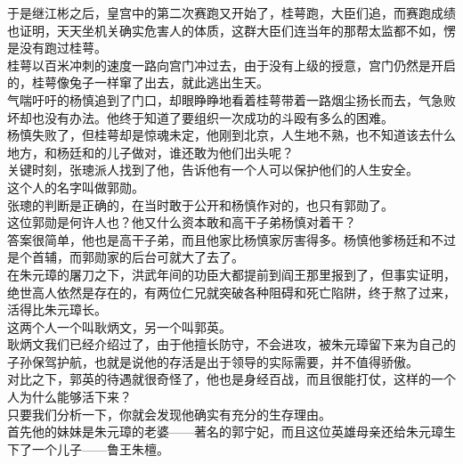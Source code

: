 \begin{multicols}{\theparacolNo}
于是继江彬之后，皇宫中的第二次赛跑又开始了，桂萼跑，大臣们追，而赛跑成绩也证明，天天坐机关确实危害人的体质，这群大臣们连当年的那帮太监都不如，愣是没有跑过桂萼。\\

桂萼以百米冲刺的速度一路向宫门冲过去，由于没有上级的授意，宫门仍然是开启的，桂萼像兔子一样窜了出去，就此逃出生天。\\

气喘吁吁的杨慎追到了门口，却眼睁睁地看着桂萼带着一路烟尘扬长而去，气急败坏却也没有办法。他终于知道了要组织一次成功的斗殴有多么的困难。\\

杨慎失败了，但桂萼却是惊魂未定，他刚到北京，人生地不熟，也不知道该去什么地方，和杨廷和的儿子做对，谁还敢为他们出头呢？\\

关键时刻，张璁派人找到了他，告诉他有一个人可以保护他们的人生安全。\\

这个人的名字叫做郭勋。\\

张璁的判断是正确的，在当时敢于公开和杨慎作对的，也只有郭勋了。\\

这位郭勋是何许人也？他又什么资本敢和高干子弟杨慎对着干？\\

答案很简单，他也是高干子弟，而且他家比杨慎家厉害得多。杨慎他爹杨廷和不过是个首辅，而郭勋家的后台可就大了去了。\\

在朱元璋的屠刀之下，洪武年间的功臣大都提前到阎王那里报到了，但事实证明，绝世高人依然是存在的，有两位仁兄就突破各种阻碍和死亡陷阱，终于熬了过来，活得比朱元璋长。\\

这两个人一个叫耿炳文，另一个叫郭英。\\

耿炳文我们已经介绍过了，由于他擅长防守，不会进攻，被朱元璋留下来为自己的子孙保驾护航，也就是说他的存活是出于领导的实际需要，并不值得骄傲。\\

对比之下，郭英的待遇就很奇怪了，他也是身经百战，而且很能打仗，这样的一个人为什么能够活下来？\\

只要我们分析一下，你就会发现他确实有充分的生存理由。\\

首先他的妹妹是朱元璋的老婆——著名的郭宁妃，而且这位英雄母亲还给朱元璋生下了一个儿子——鲁王朱檀。\\


\end{multicols}
